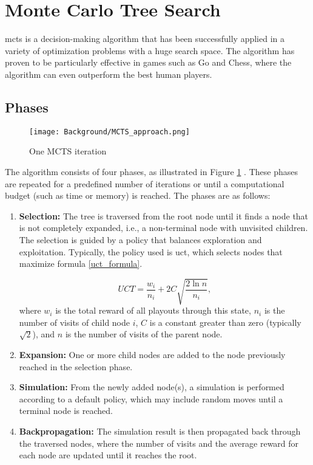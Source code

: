 \section{Monte Carlo Tree Search}

\ac{mcts} is a decision-making algorithm that has been successfully applied in a variety of optimization problems with a huge search space. The algorithm has proven to be particularly effective in games such as Go and Chess, where the algorithm can even outperform the best human players.

\subsection{Phases}

\begin{figure}
      \centering
      \texttt{[image: Background/MCTS\_approach.png]}
      \caption[MCTS approach]
      {One MCTS iteration \cite{browne_survey_2012}}
      \label{fig:mcts_approach}
\end{figure}

The algorithm consists of four phases, as illustrated in Figure \ref{fig:mcts_approach} \cite{browne_survey_2012}. These phases are repeated for a predefined number of iterations or until a computational budget (such as time or memory) is reached. The phases are as follows:

\begin{enumerate}
	\item \textbf{Selection:} The tree is traversed from the root node until it finds a node that is not completely expanded, i.e., a non-terminal node with unvisited children. The selection is guided by a policy that balances exploration and exploitation. Typically, the policy used is \ac{uct}, which selects nodes that maximize formula \ref{uct_formula}.
	 
	\begin{equation}
	UCT = \frac{w_i}{n_i} + 2C\sqrt{\frac{2\ln{n}}{n_i}},\label{uct_formula}
	\end{equation} where \(w_i\) is the total reward of all playouts through this state, \(n_i\) is the number of visits of child node \(i\), \(C\) is a constant greater than zero (typically \(\sqrt{2}\)), and \(n\) is the number of visits of the parent node.
    \item \textbf{Expansion:} One or more child nodes are added to the node previously reached in the selection phase.
    \item \textbf{Simulation:} From the newly added node(s), a simulation is performed according to a default policy, which may include random moves until a terminal node is reached.
    \item \textbf{Backpropagation:} The simulation result is then propagated back through the traversed nodes, where the number of visits and the average reward for each node are updated until it reaches the root.
\end{enumerate}

